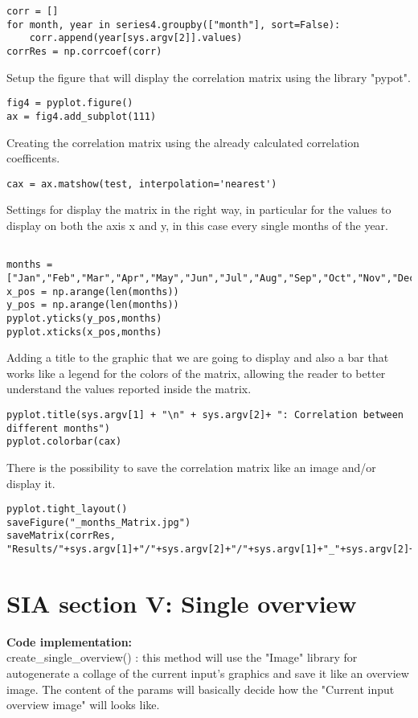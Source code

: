 \begin{lstlisting}
corr = []
for month, year in series4.groupby(["month"], sort=False):
	corr.append(year[sys.argv[2]].values)
corrRes = np.corrcoef(corr)
\end{lstlisting}

Setup the figure that will display the correlation matrix using the library "pypot".
\begin{lstlisting}
fig4 = pyplot.figure()
ax = fig4.add_subplot(111)
\end{lstlisting}

Creating the correlation matrix using the already calculated correlation coefficents.
\begin{lstlisting}
cax = ax.matshow(test, interpolation='nearest')
\end{lstlisting}

Settings for display the matrix in the right way, in particular for the values to display on both the axis x and y, in this case every single months of the year.
\begin{lstlisting}

months = ["Jan","Feb","Mar","Apr","May","Jun","Jul","Aug","Sep","Oct","Nov","Dec"]
x_pos = np.arange(len(months))
y_pos = np.arange(len(months))
pyplot.yticks(y_pos,months)
pyplot.xticks(x_pos,months)
\end{lstlisting}
Adding a title to the graphic that we are going to display and also a bar that works like a legend for the colors of the matrix, allowing the reader to better understand the values reported inside the matrix.
\begin{lstlisting}
pyplot.title(sys.argv[1] + "\n" + sys.argv[2]+ ": Correlation between different months")
pyplot.colorbar(cax)
\end{lstlisting}

There is the possibility to save the correlation matrix like an image and/or display it.
\begin{lstlisting}
pyplot.tight_layout()
saveFigure("_months_Matrix.jpg")
saveMatrix(corrRes, "Results/"+sys.argv[1]+"/"+sys.argv[2]+"/"+sys.argv[1]+"_"+sys.argv[2]+"_months_CorrCoeff.csv")

\end{lstlisting}

\section{SIA section V: Single overview}
\label{SIA_section_V}
\textbf{Code implementation:}\\
create\_single\_overview() : this method will use the "Image" library for autogenerate a collage of the current input's graphics and save it like an overview image. The content of the params will basically decide how the "Current input overview image" will looks like.

